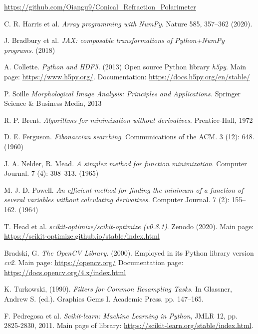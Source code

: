 \documentclass[11pt, a4paper, twoside]{article} %
\begin{document}
\begin{thebibliography}{1}
{\href{https://github.com/Oiangu9/Conical_Refraction_Polarimeter}{https://github.com/Oiangu9/Conical\_Refraction\_Polarimeter}

C. R. Harris et al. {\em Array programming with NumPy}. Nature 585, 357–362 (2020).


J. Bradbury et al. {\em {JAX}: composable transformations of {P}ython+{N}um{P}y programs}. (2018)

A. Collette. {\em Python and HDF5.} (2013) Open source Python library {\em h5py}. Main page: \href{https://www.h5py.org/}{https://www.h5py.org/}. Documentation: \href{https://docs.h5py.org/en/stable/}{https://docs.h5py.org/en/stable/}

P. Soille {\em Morphological Image Analysis: Principles and Applications.} Springer Science \& Business Media, 2013

R. P. Brent. {\em Algorithms for minimization without derivatives.} Prentice-Hall, 1972

D. E. Ferguson. {\em Fibonaccian searching}. Communications of the ACM. 3 (12): 648. (1960)

J. A. Nelder, R. Mead. {\em A simplex method for function minimization}. Computer Journal. 7 (4): 308–313. (1965)

M. J. D.  Powell. {\em An efficient method for finding the minimum of a function of several variables without calculating derivatives.} Computer Journal. 7 (2): 155–162. (1964)

T. Head et al. {\em scikit-optimize/scikit-optimize (v0.8.1)}. Zenodo (2020). Main page: \href{https://scikit-optimize.github.io/stable/index.html}{https://scikit-optimize.github.io/stable/index.html}

Bradski, G. {\em The OpenCV Library.} (2000). Employed in its Python library version {\em cv2}. Main page: \href{https://opencv.org/}{https://opencv.org/} Documentation page: \href{https://docs.opencv.org/4.x/index.html}{https://docs.opencv.org/4.x/index.html}

K. Turkowski, (1990). {\em Filters for Common Resampling Tasks.} In Glassner, Andrew S. (ed.). Graphics Gems I. Academic Press. pp. 147–165.

F. Pedregosa et al. {\em Scikit-learn: Machine Learning in Python}, JMLR 12, pp. 2825-2830, 2011. Main page of library: \href{https://scikit-learn.org/stable/index.html}{https://scikit-learn.org/stable/index.html}.

}
\end{thebibliography}
\end{document}
